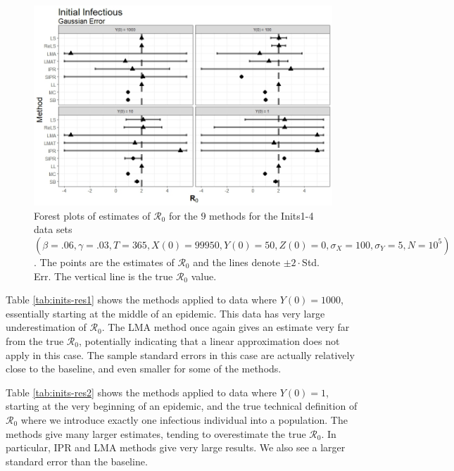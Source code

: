 \documentclass[12pt]{article}
\newcommand{\xxsir}{\ensuremath{9} } %
\newcommand{\rr}{\ensuremath{\mathcal{R}_0}}
\begin{document}
\begin{figure}[H]
  \centering
  \includegraphics[scale=0.5]{images/start_n.jpeg}
    \caption{Forest plots of estimates of $\rr$ for the \xxsir methods for the Inits1-4 data sets $(\beta=.06, \gamma=.03, T=365, X(0)=99950, Y(0)=50, Z(0)=0, \sigma_X=100, \sigma_Y=5, N=10^5)$.  The points are the estimates of $\rr$ and the lines denote $\pm 2\cdot $Std. Err.  The vertical line is the true $\rr$ value.}\label{fig:inits-res}
  \end{figure}

  Table \ref{tab:inits-res1} shows the methods applied to data where $Y(0) = 1000$, essentially starting at the middle of an epidemic. This data has very large underestimation of $\rr$. The LMA method once again gives an estimate very far from the true $\rr$, potentially indicating that a linear approximation does not apply in this case. The sample standard errors in this case are actually relatively close to the baseline, and even smaller for some of the methods.

Table \ref{tab:inits-res2} shows the methods applied to data where $Y(0) = 1$, starting at the very beginning of an epidemic, and the true technical definition of $\rr$ where we introduce exactly one infectious individual into a population. The methods give many larger estimates, tending to overestimate the true $\rr$. In particular, IPR and LMA methods give very large results. We also see a larger standard error than the baseline.
\end{document}

